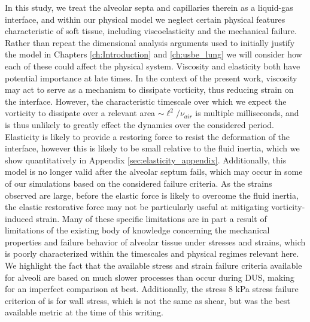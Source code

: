 In this study, we treat the alveolar septa and capillaries therein as
a liquid-gas interface, and within our physical model we neglect
certain physical features characteristic of soft tissue, including
viscoelasticity and the mechanical failure. Rather than repeat the
dimensional analysis arguments used to initially justify the model in
Chapters \ref{ch:Introduction} and \ref{ch:usbe_lung} we will consider
how each of these could affect the physical system. Viscosity and
elasticity both have potential importance at late times. In the
context of the present work, viscosity may act to serve as a mechanism
to dissipate vorticity, thus reducing strain on the
interface. However, the characteristic timescale over which we expect
the vorticity to dissipate over a relevant area $\sim\ell^2/\nu_{air}$
is multiple milliseconds, and is thus unlikely to greatly effect the
dynamics over the considered period. Elasticity is likely to provide a
restoring force to resist the deformation of the interface, however
this is likely to be small relative to the fluid inertia, which we
show quantitatively in Appendix
\ref{sec:elasticity_appendix}. Additionally, this model is no longer
valid after the alveolar septum fails, which may occur in some of our
simulations based on the considered failure criteria. As the strains
observed are large, before the elastic force is likely to overcome the
fluid inertia, the elastic restorative force may not be particularly
useful at mitigating vorticity-induced strain. Many of these specific
limitations are in part a result of limitations of the existing body
of knowledge concerning the mechanical properties and failure behavior
of alveolar tissue under stresses and strains, which is poorly
characterized within the timescales and physical regimes relevant
here. We highlight the fact that the available stress and strain
failure criteria available for alveoli are based on much slower
processes than occur during \ac{DUS}, making for an imperfect
comparison at best. Additionally, the stress $8$ kPa stress failure
criterion of \cite{West1991} is for wall stress, which is not the same
as shear, but was the best available metric at the time of this
writing.

